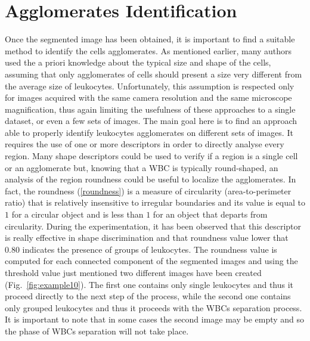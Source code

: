 \documentclass[final,a4paper,12pt,english]{UnicaPhdThesis3}
\begin{document}
\section{Agglomerates Identification} 
Once the segmented image has been obtained, it is important to find a suitable method to identify the cells agglomerates. As mentioned earlier, many authors used the a priori knowledge about the typical size and shape of the cells, assuming that only agglomerates of cells should present a size very different from the average size of leukocytes. Unfortunately, this assumption is respected only for images acquired with the same camera resolution and the same microscope magnification, thus again limiting the usefulness of these approaches to a single dataset, or even a few sets of images. The main goal here is to find an approach able to properly identify leukocytes agglomerates on different sets of images. It requires the use of one or more descriptors in order to directly analyse every region. Many shape descriptors could be used to verify if a region is a single cell or an agglomerate \cite{Gonz} but, knowing that a WBC is typically round-shaped, an analysis of the region roundness could be useful to localize the agglomerates. In fact, the roundness (\ref{roundness}) is a measure of circularity (area-to-perimeter ratio) that is relatively insensitive to irregular boundaries and its value is equal to $1$ for a circular object and is less than $1$ for an object that departs from circularity. During the experimentation, it has been observed that this descriptor is really effective in shape discrimination and that roundness value lower that $0.80$ indicates the presence of groups of leukocytes. The roundness value is computed for each connected component of the segmented images and using the threshold value just mentioned two different images have been created (Fig.~\ref{fig:example10}). The first one contains only single leukocytes and thus it proceed directly to the next step of the process, while the second one contains only grouped leukocytes and thus it proceeds with the WBCs separation process. It is important to note that in some cases the second image may be empty and so the phase of WBCs separation will not take place.	
\end{document}
